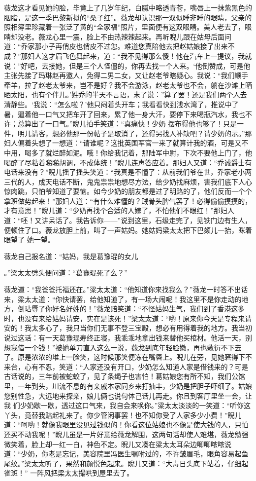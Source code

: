 \documentclass{article}
\begin{document}
薇龙这才看见她的脸，毕竟上了几岁年纪，白腻中略透青苍，嘴唇上一抹紫黑色的胭脂，是这一季巴黎新拟的“桑子红”。薇龙却认识那一双似睡非睡的眼睛，父亲的照相簿里珍藏着一张泛了黄的“全家福”照片，里面便有这双眼睛。美人老去了，眼睛却没老。薇龙心里一震，脸上不由热辣辣起来。再听睨儿跟在姑母后面问道：“乔家那小子再俏皮也俏皮不过您。难道您真陪他去把赵姑娘接了出来不成？”那妇人这才眉飞色舞起来，道：“我不见得那么傻！他在汽车上一提议，我就说：”好吧，去接她，但是三个人怪僵的，你再去找一个人来。‘他倒赞成，可是他主张先接了玛琳赵再邀人，免得二男二女，又让赵老爷瞎疑心。我说：“我们顺手牵羊，拉了赵老太爷来，岂不是好？我不会游泳，赵老太爷也不会，躺在沙滩上晒晒太阳，也有个伴儿。’姓乔的半天不言语，末了说：”算了罢！还是我们两个人去清静些。‘我说：“怎么啦？’他只闷着头开车；我看看快到浅水湾了，推说中了暑，逼着他一口气又把车开了回来，累了他一身大汗，要停下来喝瓶汽水，我也不许；总算出了一口气。”睨儿拍手笑道：“真痛快！少奶
\newpage
摆布得他也够了！只是一件，明儿请客，想必他那一份帖子是取消了，还得另找人补缺吧？请少奶的示。”那妇人偏着头想了一想道：“请谁呢？这批英国军官一来了就算计我的酒，可是又不中用，喝多了就烂醉如泥。哦！你给我记着，那陆军中尉，下次不要他上门了，他喝醉了尽粘着睇睇胡调，不成体统！”睨儿连声答应着。那妇人又道：“乔诚爵士有电话来没有？”睨儿摇了摇头笑道：“我真是不懂了：从前我们爷在世，乔家老小两三代的人，成天电话不断，鬼鬼祟祟地想尽方法，给少奶找麻烦，害我们底下人心惊肉跳，只怕爷知道了要恼。如今少奶的朋友都是过了明路的了，他们反而一个个拿班做势起来！”那妇人道：“有什么难懂的？贼骨头脾气罢了！必得偷偷摸摸的，才有意思！”睨儿道：“少奶再找个合适的人嫁了，不怕他们不眼红！”那妇人道：“呸！又讲呆话了。我告诉你——”说到这里，石级走完了，见铁门边有生人，便顿住了口。薇龙放胆上前，叫了一声姑妈。她姑妈梁太太把下巴颏儿一抬，眯着眼望了
她一望。 

薇龙自己报名道：“姑妈，我是葛豫琨的女儿
\newpage

。”梁太太劈头便问道：“葛豫琨死了么？” 

薇龙道：“我爸爸托福还在。”梁太太道：“他知道你来找我么？”薇龙一时答不出话来，梁太太道：“你快请罢，给他知道了，有一场大闹呢！我这里不是你走动的地方，倒玷辱了你好名好姓的！”薇龙赔笑道：“不怪姑妈生气，我们到了香港这多时，也没有来给姑妈请安，实在是该死！”梁太太道：“哟！原来你今天是专程来请安的！我太多心了，我只当你们无事不登三宝殿，想必有用得着我的地方。我当初说过这话：有一天葛豫琨寿终正寝，我乖乖地拿出钱来替他买棺材。他活一天，别想我借一个钱！”被她单刀直入这么一说，薇龙到底年轻脸嫩，再也敷衍不下去了。原是浓浓的堆上一脸笑，这时候那笑便冻在嘴唇上。睨儿在旁，见她窘得下不来台，心有不忍，笑道：“人家还没有开口，少奶怎么知道人家是借钱来的？可是古话说的，三年前被蛇蛟了，见了条绳子也害怕！葛姑娘您有所不知，我们公馆里，一年到头，川流不息的有亲戚本家同乡来打抽丰，少奶是把胆子吓细了。姑娘您别性急，大远地来探亲，娘儿俩也说句体己话儿再走。你且到客厅里坐一会，让我
\newpage
们少奶歇一歇，透过这口气来，我自会来唤你。”梁太太淡淡的一笑道：“听你这丫头，竟替我赔起礼来了。你少管闲事罢！也不知你受了人家多少小费！”睨儿道：“呵哟！就像我眼里没见过钱似的！你看这位姑娘也不像是使大钱的人，只怕还买不动我呢！”睨儿虽是一片好意给薇龙解围，这两句话却使人难堪，薇龙勉强微笑着，脸上却一红一白，神色不定。睨儿又凑在梁太太耳朵边唧唧哝哝说道：“少奶，你老是忘记，美容院里冯医生嘱咐过的，不许皱眉毛，眼角容易起鱼尾纹。”梁太太听了，果然和颜悦色起来。睨儿又道：“大毒日头底下站着，仔细起雀斑！”
一阵风把梁太太撮哄到屋里去了。 
\end{document}
